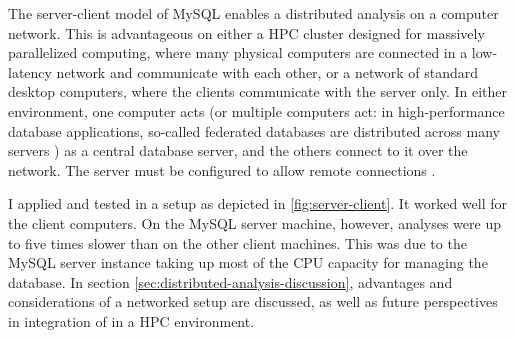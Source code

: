 \label{sec:distributed-analysis}
The server-client model of MySQL enables a distributed analysis on a computer
network. This is advantageous on either a HPC cluster designed for massively
parallelized computing, where many physical computers are connected in a
low-latency network and communicate with each other, or a network of standard
desktop computers, where the clients communicate with the server only. In either
environment, one computer acts (or multiple computers act: in high-performance
database applications, so-called federated databases are distributed across many
servers \citep{schwartz2012}) as a central database server, and the others
connect to it over the network. The server must be configured to allow remote
connections \citep{mysql2013}.



I applied and tested \pname in a setup as depicted in
\autoref{fig:server-client}. It worked well for the client computers. On the
MySQL server machine, however, \pname analyses were up to five times slower than
on the other client machines. This was due to the MySQL server instance taking
up most of the CPU capacity for managing the database. In section
\autoref{sec:distributed-analysis-discussion}, advantages and considerations of
a networked setup are discussed, as well as future perspectives in integration
of \pname in a HPC environment.

